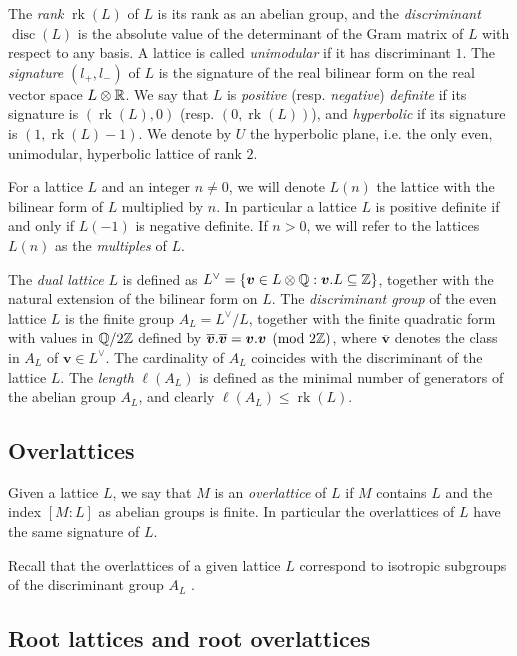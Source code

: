 \documentclass[11pt,letterpaper]{amsart}
\newcommand{\vect}[1]{\boldsymbol{#1}}
\DeclareMathOperator{\rk}{rk}
\DeclareMathOperator{\disc}{disc}
\begin{document}
The \emph{rank} $\rk(L)$ of $L$ is its rank as an abelian group, and the \emph{discriminant} $\disc(L)$ is the absolute value of the determinant of the Gram matrix of $L$ with respect to any basis. A lattice is called \emph{unimodular} if it has discriminant $1$.
The \emph{signature} $(l_+,l_-)$ of $L$ is the signature of the real bilinear form on the real vector space $L\otimes \mathbb{R}$. We say that $L$ is \emph{positive} (resp. \emph{negative}) \emph{definite} if its signature is $(\rk(L),0)$ (resp. $(0,\rk(L))$), and \emph{hyperbolic} if its signature is $(1,\rk(L)-1)$.
We denote by $U$ the hyperbolic plane, i.e. the only even, unimodular, hyperbolic lattice of rank $2$.

For a lattice $L$ and an integer $n\ne 0$, we will denote $L(n)$ the lattice with the bilinear form of $L$ multiplied by $n$. In particular a lattice $L$ is positive definite if and only if $L(-1)$ is negative definite. If $n>0$, we will refer to the lattices $L(n)$ as the \emph{multiples} of $L$.

The \emph{dual lattice} $L$ is defined as $L^\vee=\{\vect{v}\in L\otimes \QQ : \vect{v}.L\subseteq \ZZ\}$, together with the natural extension of the bilinear form on $L$. The \emph{discriminant group} of the even lattice $L$ is the finite group $A_L=L^\vee/L$, together with the finite quadratic form with values in $\mathbb{Q}/2\mathbb{Z}$ defined by $\overline{\vect{v}}.\overline{\vect{v}}=\vect{v}.\vect{v} \pmod{2\ZZ}$, where $\overline{\vect{v}}$ denotes the class in $A_L$ of $\vect{v}\in L^\vee$.
The cardinality of $A_L$ coincides with the discriminant of the lattice $L$. The \emph{length} $\ell(A_L)$ is defined as the minimal number of generators of the abelian group $A_L$, and clearly $\ell(A_L)\le \rk(L)$.

\subsection{Overlattices}

Given a lattice $L$, we say that $M$ is an \emph{overlattice} of $L$ if $M$ contains $L$ and the index $[M:L]$ as abelian groups is finite. In particular the overlattices of $L$ have the same signature of $L$.

Recall that the overlattices of a given lattice $L$ correspond to isotropic subgroups of the discriminant group $A_L$ {\cite[Proposition~1.4.1]{nikulin.integral.symmetric.bilinear}}.

\subsection{Root lattices and root overlattices}
\end{document}
